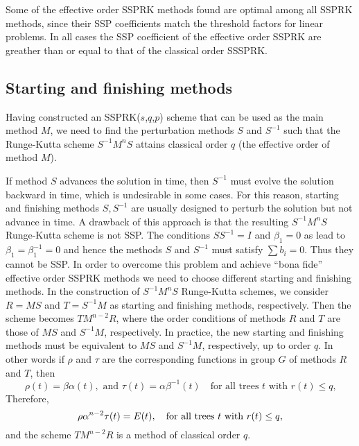 Some of the effective order SSPRK methods found are optimal among all SSPRK methods,
since their SSP coefficients match the threshold factors for linear problems.
In all cases the SSP coefficient of the effective order SSPRK are greather than or equal to that of the classical order SSSPRK.





\subsection{Starting and finishing methods}\label{subsection3.2}
Having constructed an SSPRK(\( s \),\( q \),\( p \)) scheme that can
be used as the main method \( M \), we need to find the perturbation
methods \( S \) and \( S^{-1} \) such that the Runge-Kutta scheme \(
S^{-1}M^{n}S \) attains classical order $q$ (the effective order of
method \( M \)).

If method $S$ advances the solution in time,
then $S^{-1}$ must evolve the solution backward in time, which is undesirable in
some cases.  For this reason,
starting and finishing methods $S,S^{-1}$ are usually designed to perturb
the solution but not advance in time.  
A drawback of this approach is that the resulting \(
S^{-1}M^{n}S \) Runge-Kutta scheme is not SSP. The conditions \( SS^{-1} = I \)
and \( \beta_{1} = 0 \) as lead to \( \beta_{1} = \beta^{-1}_{1} = 0 \) and
hence the methods \( S \) and \( S^{-1} \) must satisfy $\sum b_i = 0$.  Thus
they cannot be SSP.
In order to overcome this problem and achieve ``bona fide'' effective order SSPRK methods we need to choose different starting and finishing methods. In the construction of \( S^{-1}M^{n}S \) Runge-Kutta schemes, we consider \( R = MS \) and \( T = S^{-1}M \) as starting and finishing methods, respectively. Then the scheme becomes \( TM^{n-2}R \), where the order conditions of methods \( R \) and \( T \) are those of \( MS \) and \( S^{-1}M \), respectively.
In practice, the new starting and finishing methods must be equivalent to \( MS \) and \( S^{-1}M \), respectively, up to order $q$.
 In other words if \( \rho \) and \( \tau \) are the corresponding functions in group $G$ of methods \( R \) and \( T \), then
\begin{equation} \label{eq:PT_OCs}
    \rho(t) = \beta\alpha(t), \text{ and } \tau(t) = \alpha\beta^{-1}(t) \quad \text{for all trees $t$ with $r(t) \leq q$,}
\end{equation}
Therefore,
\begin{equation} \label{eq:TM^{n-2}R_OCs}
    \rho\alpha^{n-2}\tau(t) = E(t), \quad \text{for all trees $t$ with $r(t) \leq q$,}
\end{equation}
and the scheme \( TM^{n-2}R \) is a method of classical order \( q \).

